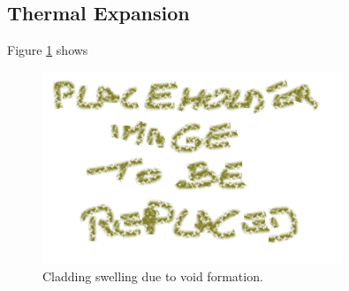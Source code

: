 \subsection{Thermal Expansion}
Figure \ref{fig:th_expansion} shows 

\begin{figure}[H]
\centering
\includegraphics[width=0.8\textwidth]{placeholder.png}
\caption{Cladding swelling due to void formation.}
\label{fig:th_expansion}
\end{figure}
